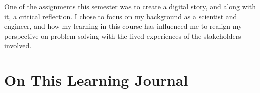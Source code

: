 \documentclass{report}
\begin{document}
\hspace{24pt} One of the assignments this semester was to create a digital story, and along with it, a critical reflection. I chose to focus on my background as a scientist and engineer, and how my learning in this course has influenced me to realign my perspective on problem-solving with the lived experiences of the stakeholders involved.

\section{On This Learning Journal}

\hspace{24pt} 

\clearpage

\printbibliography[heading=bibintoc]
\end{document}
